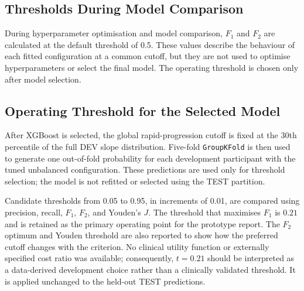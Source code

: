 \subsection{Thresholds During Model Comparison}
\label{sec:methods_threshold_foldwise}
During hyperparameter optimisation and model comparison, $F_1$ and $F_2$ are calculated at the default threshold of 0.5. These values describe the behaviour of each fitted configuration at a common cutoff, but they are not used to optimise hyperparameters or select the final model. The operating threshold is chosen only after model selection.

\subsection{Operating Threshold for the Selected Model}
\label{sec:methods_threshold_final}
After XGBoost is selected, the global rapid-progression cutoff is fixed at the 30th percentile of the full \gls{DEV} slope distribution. Five-fold \texttt{GroupKFold} is then used to generate one out-of-fold probability for each development participant with the tuned unbalanced configuration. These predictions are used only for threshold selection; the model is not refitted or selected using the \gls{TEST} partition.

Candidate thresholds from 0.05 to 0.95, in increments of 0.01, are compared using precision, recall, $F_1$, $F_2$, and Youden's $J$. The threshold that maximises $F_1$ is $0.21$ and is retained as the primary operating point for the prototype report. The $F_2$ optimum and Youden threshold are also reported to show how the preferred cutoff changes with the criterion. No clinical utility function or externally specified cost ratio was available; consequently, $t=0.21$ should be interpreted as a data-derived development choice rather than a clinically validated threshold. It is applied unchanged to the held-out \gls{TEST} predictions.

